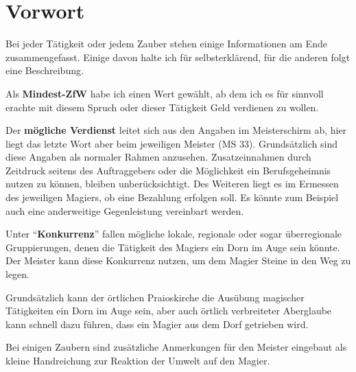 \section{Vorwort}
Bei jeder Tätigkeit oder jedem Zauber stehen einige Informationen am Ende zusammengefasst. Einige davon halte ich für selbsterklärend, für die anderen folgt eine Beschreibung.

Als \textbf{Mindest-ZfW} habe ich einen Wert gewählt, ab dem ich es für sinnvoll erachte mit diesem Spruch oder dieser Tätigkeit Geld verdienen zu wollen.

Der \textbf{mögliche Verdienst} leitet sich aus den Angaben im Meisterschirm ab, hier liegt das letzte Wort aber beim jeweiligen Meister (MS 33). Grundsätzlich sind diese Angaben als normaler Rahmen anzusehen. Zusatzeinnahmen durch Zeitdruck seitens des Auftraggebers oder die Möglichkeit ein Berufsgeheimnis nutzen zu können, bleiben unberücksichtigt. Des Weiteren liegt es im Ermessen des jeweiligen Magiers, ob eine Bezahlung erfolgen soll. Es könnte zum Beispiel auch eine anderweitige Gegenleistung vereinbart werden.

Unter \enquote{\textbf{Konkurrenz}} fallen mögliche lokale, regionale oder sogar überregionale Gruppierungen, denen die Tätigkeit des Magiers ein Dorn im Auge sein könnte. Der Meister kann diese Konkurrenz nutzen, um dem Magier Steine in den Weg zu legen.

Grundsätzlich kann der örtlichen Praioskirche die Ausübung magischer Tätigkeiten ein Dorn im Auge sein, aber auch örtlich verbreiteter Aberglaube kann schnell dazu führen, dass ein Magier aus dem Dorf getrieben wird.

Bei einigen Zaubern sind zusätzliche Anmerkungen für den Meister eingebaut als kleine Handreichung zur Reaktion der Umwelt auf den Magier.
